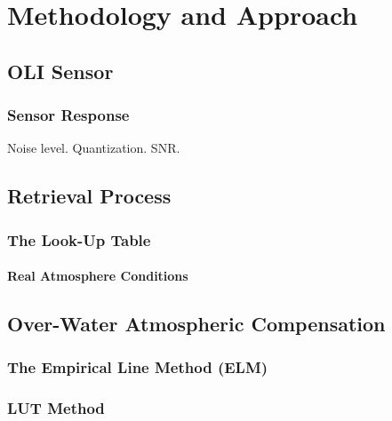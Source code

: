 \chapter{Methodology and Approach}
\section{OLI Sensor}
\subsection{Sensor Response}
Noise level. Quantization. SNR.

\section{Retrieval Process}
\subsection{The Look-Up Table}


\subsubsection{Real Atmosphere Conditions}



\section{Over-Water Atmospheric Compensation}
\subsection{The Empirical Line Method (ELM)}
\subsection{LUT Method}